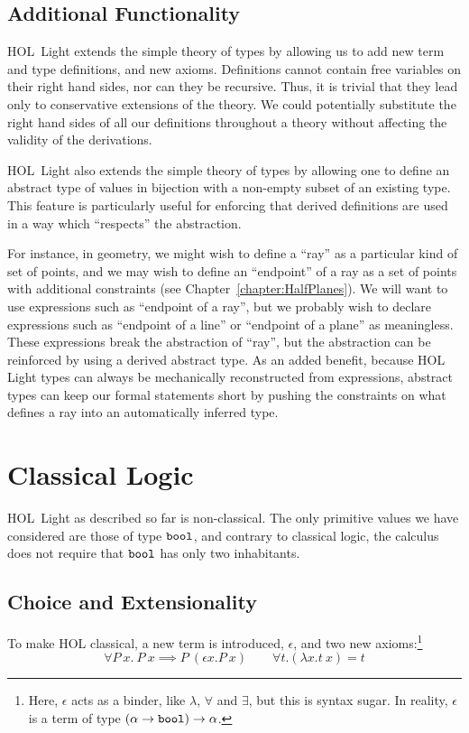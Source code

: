\subsection{Additional Functionality}
HOL~Light extends the simple theory of types by allowing us to add new term and type definitions, and new axioms. Definitions cannot contain free variables on their right hand sides, nor can they be recursive. Thus, it is trivial that they lead only to conservative extensions of the theory. We could potentially substitute the right hand sides of all our definitions throughout a theory without affecting the validity of the derivations. 

HOL~Light also extends the simple theory of types by allowing one to define an abstract type of values in bijection with a non-empty subset of an existing type. This feature is particularly useful for enforcing that derived definitions are used in a way which ``respects'' the abstraction. 

For instance, in geometry, we might wish to define a ``ray'' as a particular kind of set of points, and we may wish to define an ``endpoint'' of a ray as a set of points with additional constraints (see Chapter~\ref{chapter:HalfPlanes}). We will want to use expressions such as ``endpoint of a ray'', but we probably wish to declare expressions such as ``endpoint of a line'' or ``endpoint of a plane'' as meaningless. These expressions break the abstraction of ``ray'', but the abstraction can be reinforced by using a derived abstract type. As an added benefit, because HOL Light types can always be mechanically reconstructed from expressions, abstract types can keep our formal statements short by pushing the constraints on what defines a ray into an automatically inferred type.

\section{Classical Logic}
HOL~Light as described so far is non-classical. The only primitive values we have considered are those of type $\texttt{bool}$, and contrary to classical logic, the calculus does not require that $\texttt{bool}$ has only two inhabitants. 

\subsection{Choice and Extensionality}
To make HOL classical, a new term is introduced, $\epsilon$, and two new axioms:\footnote{Here, $\epsilon$ acts as a binder, like $\lambda$, $\forall$ and $\exists$, but this is syntax sugar. In reality, $\epsilon$ is a term of type $(\alpha \rightarrow \texttt{bool}) \rightarrow \alpha$.}
\begin{displaymath}
\forall P\ x.\ P\ x \implies P\ (\epsilon x. P\ x) \qquad \forall t. (\lambda x. t\ x) = t
\end{displaymath}

